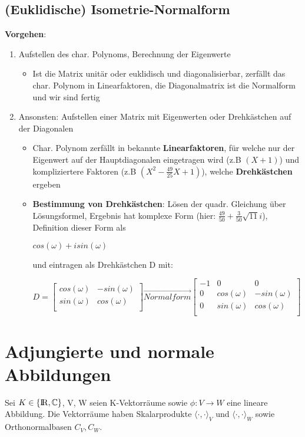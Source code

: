 \documentclass[10pt,a4paper]{article}
\def\realnumbers{{\rm I\!R}}
\def\complexnumbers{{\mathbb{C}}}
\begin{document}
	\subsection{(Euklidische) Isometrie-Normalform}
	\textbf{Vorgehen}:
	\begin{enumerate}
		\item Aufstellen des char. Polynoms, Berechnung der Eigenwerte
		\begin{itemize}
			\item Ist die Matrix unitär oder euklidisch und diagonalisierbar, zerfällt das char. Polynom in Linearfaktoren, die Diagonalmatrix ist die Normalform und wir sind fertig
		\end{itemize}
		\item Ansonsten: Aufstellen einer Matrix mit Eigenwerten oder Drehkästchen auf der Diagonalen
		\begin{itemize}
			\item Char. Polynom zerfällt in bekannte \textbf{Linearfaktoren}, für welche nur der Eigenwert auf der Hauptdiagonalen eingetragen wird (z.B $(X + 1)$) und kompliziertere Faktoren (z.B $(X^2 - \frac{49}{25}X + 1)$), welche \textbf{Drehkästchen} ergeben
			\item \textbf{Bestimmung von Drehkästchen}: Lösen der quadr. Gleichung über Lösungsformel, Ergebnis hat komplexe Form (hier: $\frac{49}{50} + \frac{3}{50}\sqrt{11}i$), Definition dieser Form als
			\begin{center}
				$cos(\omega) + isin(\omega)$
			\end{center}
			und eintragen als Drehkästchen D mit:
			\begin{center}
				$D = \begin{bmatrix}
					cos(\omega) & -sin(\omega)\\
					sin(\omega) & cos(\omega)\\
				\end{bmatrix}
				\overrightarrow{Normalform} \begin{bmatrix}
					-1 & 0 & 0 \\
					0 & cos(\omega) & -sin(\omega)\\
					0 & sin(\omega) & cos(\omega)\\
				\end{bmatrix}$
			\end{center}
		\end{itemize}

	\end{enumerate}
	
	\section{Adjungierte und normale Abbildungen}
	Sei $K \in \{\realnumbers, \complexnumbers\}$, V, W seien K-Vektorräume sowie $\phi: V \rightarrow W$ eine lineare Abbildung. Die Vektorräume haben Skalarprodukte $\langle \cdot, \cdot\rangle_V$ und $\langle \cdot, \cdot\rangle_W$ sowie Orthonormalbasen $C_V, C_W$.
	
\end{document}
